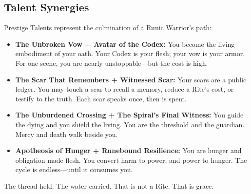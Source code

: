 \subsection{Talent Synergies}

Prestige Talents represent the culmination of a Runic Warrior's path:

\begin{itemize}
\item \textbf{The Unbroken Vow + Avatar of the Codex:} You become the living embodiment of your oath. Your Codex is your flesh; your vow is your armor. For one scene, you are nearly unstoppable—but the cost is high.
\item \textbf{The Scar That Remembers + Witnessed Scar:} Your scars are a public ledger. You may touch a scar to recall a memory, reduce a Rite's cost, or testify to the truth. Each scar speaks once, then is spent.
\item \textbf{The Unburdened Crossing + The Spiral's Final Witness:} You guide the dying and you shield the living. You are the threshold and the guardian. Mercy and death walk beside you.
\item \textbf{Apotheosis of Hunger + Runebound Resilience:} You are hunger and obligation made flesh. You convert harm to power, and power to hunger. The cycle is endless—until it consumes you.
\end{itemize}

The thread held. The water carried. That is not a Rite. That is grace.
